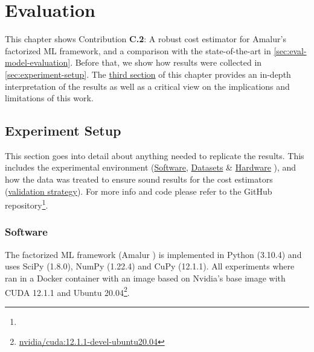 
\chapter{Evaluation}
\label{chapter:evaluation-discussion}
This chapter shows Contribution \textbf{C.2}: A robust cost estimator for Amalur's factorized ML framework, and a comparison with the state-of-the-art in \autoref{sec:eval-model-evaluation}. Before that, we show how results were collected in \autoref{sec:experiment-setup}. The \hyperref[sec:eval-discussion]{third section} of this chapter provides an in-depth interpretation of the results as well as a critical view on the implications and limitations of this work.

\section{Experiment Setup}
\label{sec:experiment-setup}

This section goes into detail about anything needed to replicate the results. This includes the experimental environment (\hyperref[subsec:6-software]{Software}, \hyperref[subsec:6-datasets]{Datasets} \& \hyperref[subsec:6-hardware]{Hardware} ),  and how the data was treated to ensure sound results for the cost estimators (\hyperref[subsec:6-validation-strategy]{validation strategy}). For more info and code please refer to the GitHub repository\footnote{}.

\subsection{Software}
\label{subsec:6-software}

The factorized ML framework (Amalur \cite{amalur}) is implemented in Python (3.10.4) and uses SciPy (1.8.0), NumPy (1.22.4) and CuPy (12.1.1). All experiments where ran in a Docker container with an image based on Nvidia's base image with CUDA 12.1.1 and Ubuntu 20.04\footnote{\href{https://hub.docker.com/layers/nvidia/cuda/12.1.1-devel-ubuntu20.04/images/sha256-5bd13c67a4479a1c13238b470d89a92937ce68ba5f21b930d50c463e3314f657?context=explore}{nvidia/cuda:12.1.1-devel-ubuntu20.04}}.

